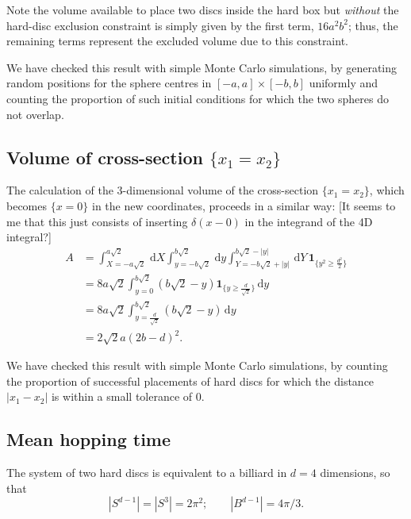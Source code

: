 \documentclass[a4paper,10pt]{article}
\newcommand{\rd}{\, \mathrm{d}}
\newcommand{\indicator}[1]{\mathbf{1}_{ \{   #1 \} } }
\begin{document}
Note the volume available to place two discs inside the hard box but \emph{without} the 
 hard-disc exclusion constraint is simply given by the first term, $16 a^2 b^2$; thus, the remaining terms represent the excluded volume due to this constraint.

We have checked this result with simple Monte Carlo simulations, by generating random positions for the sphere centres in $[-a,a] \times [-b,b]$ uniformly and 
counting the proportion of such initial conditions for which the two spheres do not overlap.





\subsection{Volume of cross-section $\{x_1 = x_2\}$}
The calculation of the $3$-dimensional volume of the cross-section $\{x_1 = x_2\}$, which becomes $\{ x=0 \}$ in the new coordinates, proceeds in a similar way:
[It seems to me that this just consists of inserting $\delta(x-0)$ in the integrand of the 4D integral?]
\begin{align}
 A &= \int_{X=-a \sqrt{2} }^{a \sqrt{2}}  \rd X
 \int_{y=-b \sqrt{2}}^{b \sqrt{2}} \rd y
\int_{Y=-b \sqrt{2} + |y| }^{b \sqrt{2}-|y|}  \rd Y
\, \indicator{y^2 \ge \frac{d^2}{2} } \\
&= 8 a \sqrt{2} \int_{y=0}^{b \sqrt{2}} \left( b \sqrt{2} - y \right)  \indicator{y \ge \frac{d}{\sqrt{2}}}  \rd y \\
&= 8 a \sqrt{2} \int_{y= \frac{d}{\sqrt{2}}}^{b \sqrt{2}}  \left( b \sqrt{2} - y \right)  \rd y \\
&= 2 \sqrt{2} a ( 2b - d )^2.
\end{align}

We have checked this result with simple Monte Carlo simulations, by counting the proportion of successful placements of hard discs for which the distance $|x_1 - x_2|$ is within a small tolerance of $0$.


\subsection{Mean hopping time}
The system of two hard discs is equivalent to a billiard in $d=4$ dimensions, so that
\begin{equation}
 |S^{d-1}| = |S^3| = 2 \pi^2; \qquad |B^{d-1}| = 4 \pi / 3.
\end{equation}
\end{document}
